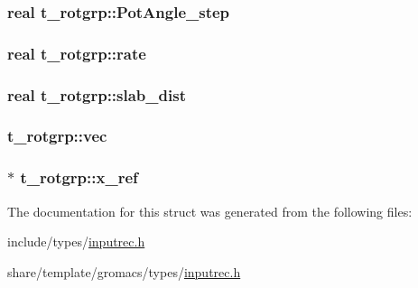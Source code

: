 \hypertarget{structt__rotgrp_a591eea5ce78209740336b9984e8a5f4c}{
\subsubsection[{\-Pot\-Angle\-\_\-step}]{\setlength{\rightskip}{0pt plus 5cm}real {\bf t\-\_\-rotgrp\-::\-Pot\-Angle\-\_\-step}}}\label{structt__rotgrp_a591eea5ce78209740336b9984e8a5f4c}
\hypertarget{structt__rotgrp_a5ee723872c5c0616ea1175586bbf915d}{
\subsubsection[{rate}]{\setlength{\rightskip}{0pt plus 5cm}real {\bf t\-\_\-rotgrp\-::rate}}}\label{structt__rotgrp_a5ee723872c5c0616ea1175586bbf915d}
\hypertarget{structt__rotgrp_a5ae7bba53e2a6a244a21c0a1baed57f6}{
\subsubsection[{slab\-\_\-dist}]{\setlength{\rightskip}{0pt plus 5cm}real {\bf t\-\_\-rotgrp\-::slab\-\_\-dist}}}\label{structt__rotgrp_a5ae7bba53e2a6a244a21c0a1baed57f6}
\hypertarget{structt__rotgrp_aaa5e8328e516370d69a3094003145aac}{
\subsubsection[{vec}]{ {\bf t\-\_\-rotgrp\-::vec}}}\label{structt__rotgrp_aaa5e8328e516370d69a3094003145aac}
\hypertarget{structt__rotgrp_ad2df571c193f21ae8021b5c08970434f}{
\subsubsection[{x\-\_\-ref}]{ $\ast$ {\bf t\-\_\-rotgrp\-::x\-\_\-ref}}}\label{structt__rotgrp_ad2df571c193f21ae8021b5c08970434f}


\-The documentation for this struct was generated from the following files\-:\begin{DoxyCompactItemize}
\item 
include/types/\hyperlink{include_2types_2inputrec_8h}{inputrec.\-h}\item 
share/template/gromacs/types/\hyperlink{share_2template_2gromacs_2types_2inputrec_8h}{inputrec.\-h}\end{DoxyCompactItemize}
